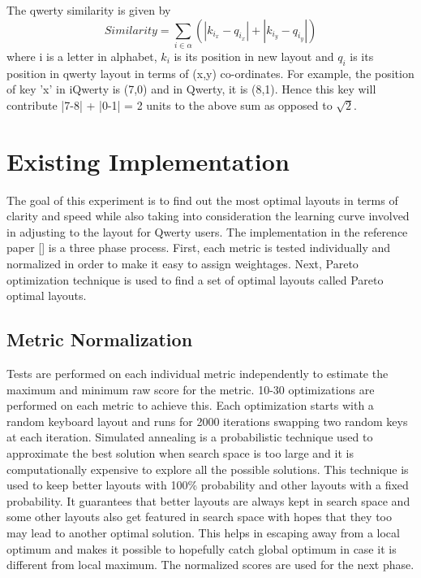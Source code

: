 \documentclass[MTech]{iitmdiss}
\begin{document}
The qwerty similarity is given by
\begin{equation}
Similarity = \sum_{i \in \alpha} (|k_{i_{x}}-q_{i_{x}}| + |k_{i_{y}}-q_{i_{y}}|)
\end{equation}
where i is a letter in alphabet,  $k_{i}$ is its position in new layout and $q_{i}$ is its position in qwerty layout in terms of (x,y) co-ordinates. For example, the position of key 'x' in iQwerty is (7,0) and in Qwerty, it is (8,1). Hence this key will contribute |7-8| + |0-1| = 2 units to the above sum as opposed to $\sqrt{2}$. 

\chapter{Existing Implementation}
The goal of this experiment is to find out the most optimal layouts in terms of clarity and speed while also taking into consideration the learning curve involved in adjusting to the layout for Qwerty users.
The implementation in the reference paper [\cite{gesturerecog}] is a three phase process. First, each metric is tested individually and normalized in order to make it easy to assign weightages. Next, Pareto optimization technique is used to find a set of optimal layouts called Pareto optimal layouts.

\section{Metric Normalization}
Tests are performed on each individual metric independently to estimate the maximum and minimum raw score for the metric.
10-30 optimizations are performed on each metric to achieve this.
Each optimization starts with a random keyboard layout and runs for 2000 iterations swapping two random keys at each iteration.
Simulated annealing is a probabilistic technique used to approximate the best solution when search space is too large and it is computationally expensive to explore all the possible solutions. This technique is used to keep better layouts with 100\% probability and other layouts with a fixed probability. It guarantees that better layouts are always kept in search space and some other layouts also get featured in search space with hopes that they too may lead to another optimal solution. This helps in escaping away from a local optimum and makes it possible to hopefully catch global optimum in case it is different from local maximum.
The normalized scores are used for the next phase.
\end{document}
